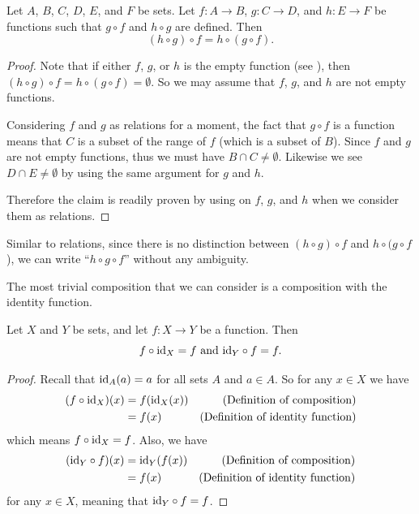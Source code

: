 \begin{theorem}
    Let $A$, $B$, $C$, $D$, $E$, and $F$ be sets. Let $f: A \to B$, $g: C \to D$, and $h: E \to F$ be functions such that $g \circ f$ and $h \circ g$ are defined. Then
    \[
        (h \circ g) \circ f = h \circ (g \circ f).   
    \]
\end{theorem}
\begin{proof}
    Note that if either $f$, $g$, or $h$ is the empty function (see ), then $(h \circ g) \circ f = h \circ (g \circ f) = \emptyset$. So we may assume that $f$, $g$, and $h$ are not empty functions.

    Considering $f$ and $g$ as relations for a moment, the fact that $g \circ f$ is a function means that $C$ is a subset of the range of $f$ (which is a subset of $B$). Since $f$ and $g$ are not empty functions, thus we must have $B \cap C \neq \emptyset$. Likewise we see $D \cap E \neq \emptyset$ by using the same argument for $g$ and $h$.

    Therefore the claim is readily proven by using  on $f$, $g$, and $h$ when we consider them as relations.
\end{proof}

Similar to relations, since there is no distinction between $(h \circ g) \circ f$ and $h \circ (g \circ f$), we can write ``$h \circ g \circ f$'' without any ambiguity.

The most trivial composition that we can consider is a composition with the identity function.

\begin{proposition}
    Let $X$ and $Y$ be sets, and let $f: X \to Y$ be a function. Then
    \[
        f\circ \mathrm{id}_X = f \text{ and } \mathrm{id}_Y \circ f = f.
    \]
\end{proposition}
\begin{proof}
    Recall that $\mathrm{id}_A(a) = a$ for all sets $A$ and $a \in A$. So for any $x \in X$ we have
    \begin{align*}
        (f \circ \mathrm{id}_X)(x) &= f(\mathrm{id}_X(x)) & (\text{Definition of composition})\\
        &= f(x) & (\text{Definition of identity function})
    \end{align*}
    which means $f \circ \mathrm{id}_X = f$. Also, we have
    \begin{align*}
        (\mathrm{id}_Y \circ f)(x) &= \mathrm{id}_Y(f(x)) & (\text{Definition of composition})\\
        &= f(x) & (\text{Definition of identity function})
    \end{align*}
    for any $x \in X$, meaning that $\mathrm{id}_Y \circ f = f$.
\end{proof}

